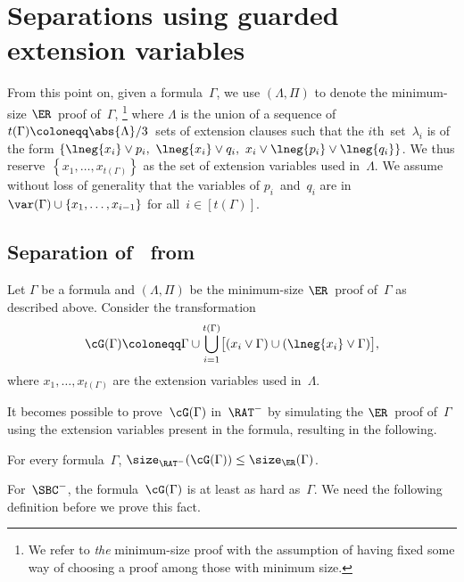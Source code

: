 \documentclass[12pt]{article}
\begin{document}
\section{Separations using guarded extension variables}
\label{sec:separations-using-guarded-extension-variables}

From this point on, given a formula~$\Gamma$, we use $(\Lambda, \Pi)$
to denote the minimum-size $\ER$~proof of~$\Gamma$,%
\footnote{We refer to \emph{the} minimum-size proof
  with the assumption of having fixed some way
  of choosing a proof among those with minimum size.}
where $\Lambda$ is the union of a sequence of
$t(\Gamma) \coloneqq \abs{\Lambda}/3$~sets of extension clauses
such that the $i$th~set~$\lambda_i$ is of the form
$\{\lneg{x_i} \lor p_i,\ \lneg{x_i} \lor q_i,\ x_i \lor \lneg{p_i} \lor \lneg{q_i}\}$.
We thus reserve~$\left\{x_1, \dots, x_{t(\Gamma)}\right\}$
as the set of extension variables used in~$\Lambda$.
We assume without loss of generality
that the variables of $p_i$~and~$q_i$ are
in~$\var(\Gamma) \cup \{x_1, \dots, x_{i-1}\}$ for all~$i \in [t(\Gamma)]$.

\subsection{Separation of~ from~}
\label{sec:RAT-from-SBC}

Let $\Gamma$ be a formula and $(\Lambda, \Pi)$ be
the minimum-size $\ER$~proof of~$\Gamma$ as described above.
Consider the transformation
\begin{equation}\label{eq:unsatisfiable-projection-transformation}
  \cG(\Gamma) \coloneqq \Gamma
  \cup \bigcup_{i = 1}^{t(\Gamma)} \bigl[
  (x_i \lor \Gamma)
  \cup (\lneg{x_i} \lor \Gamma)
  \bigr],
\end{equation}
where $x_1, \dots, x_{t(\Gamma)}$ are the extension variables used in~$\Lambda$.

It becomes possible to prove~$\cG(\Gamma)$ in~$\RAT^-$
by simulating the $\ER$~proof of~$\Gamma$
using the extension variables present in the formula,
resulting in the following.

\begin{lemma}[{\cite[Lemma~5.1]{YH23}}]\label{thm:projection-easy-for-RAT}
  For every formula~$\Gamma$,
  $\size_{\RAT^-}(\cG(\Gamma)) \leq \size_{\ER}(\Gamma)$.
\end{lemma}

For~$\SBC^-$, the formula~$\cG(\Gamma)$ is at least as hard as~$\Gamma$.
We need the following definition before we prove this fact.
\end{document}
